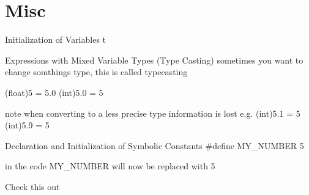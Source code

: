 \documentclass[../lecture2-variablesandcontrolstructures.tex]{subfiles}
\begin{document}
\section{Misc}


\begin{frame}[fragile]{Initialization of Variables}
t
\end{frame}


\begin{frame}[fragile]{Expressions with Mixed Variable Types (Type Casting)}
sometimes you want to change somthings type, this is called typecasting

(float)5 = 5.0
(int)5.0 = 5

note when converting to a less precise type information is lost
e.g. (int)5.1 = 5
     (int)5.9 = 5

\end{frame}


\begin{frame}[fragile]{Declaration and Initialization of Symbolic Constants}
#define MY_NUMBER 5

in the code MY_NUMBER will now be replaced with 5
\end{frame}


\begin{frame}[fragile]{Check this out}
    \begin{center}
    \end{center}
\end{frame}

\end{document}

